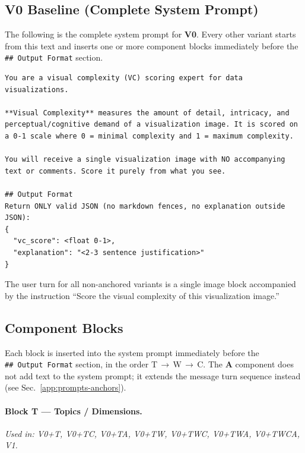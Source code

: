 \subsection{V0 Baseline (Complete System Prompt)}
\label{app:prompts-v0}

The following is the complete system prompt for \textbf{V0}. Every other
variant starts from this text and inserts one or more component blocks
immediately before the \texttt{\#\#~Output~Format} section.

\begin{lstlisting}
You are a visual complexity (VC) scoring expert for data visualizations.

**Visual Complexity** measures the amount of detail, intricacy, and perceptual/cognitive demand of a visualization image. It is scored on a 0-1 scale where 0 = minimal complexity and 1 = maximum complexity.

You will receive a single visualization image with NO accompanying text or comments. Score it purely from what you see.

## Output Format
Return ONLY valid JSON (no markdown fences, no explanation outside JSON):
{
  "vc_score": <float 0-1>,
  "explanation": "<2-3 sentence justification>"
}
\end{lstlisting}

\noindent The user turn for all non-anchored variants is a single image
block accompanied by the instruction ``Score the visual complexity of
this visualization image.''

\subsection{Component Blocks}
\label{app:prompts-components}

Each block is inserted into the system prompt immediately before the
\texttt{\#\#~Output~Format} section, in the order T\,$\rightarrow$\,W\,$\rightarrow$\,C.
The \textbf{A} component does not add text to the system prompt; it
extends the message turn sequence instead (see
Sec.~\ref{app:prompts-anchors}).

\paragraph{Block T --- Topics / Dimensions.}
\textit{Used in: V0+T, V0+TC, V0+TA, V0+TW, V0+TWC, V0+TWA, V0+TWCA, V1.}

